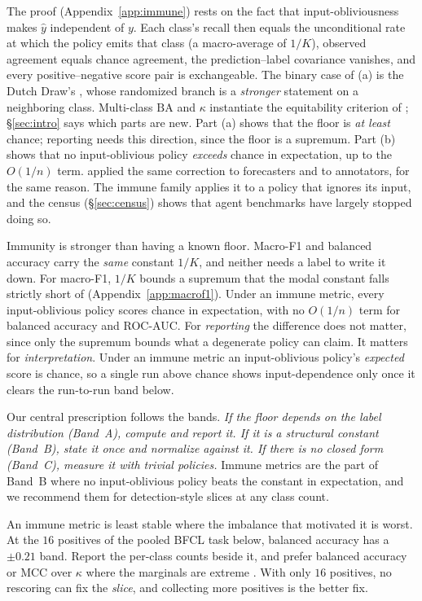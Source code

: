 \documentclass{article}
\theoremstyle{plain}
\theoremstyle{definition}
\begin{document}
The proof (Appendix~\ref{app:immune}) rests on the fact that input-obliviousness makes $\hat{y}$ independent of $y$. Each class's recall then equals the unconditional rate at which the policy emits that class (a macro-average of $1/K$), observed agreement equals chance agreement, the prediction--label covariance vanishes, and every positive--negative score pair is exchangeable. The binary case of (a) is the Dutch Draw's \citep{vandebijl2022dutchdraw}, whose randomized branch is a \emph{stronger} statement on a neighboring class. Multi-class $\mathrm{BA}$ and $\kappa$ instantiate the equitability criterion of \citet{gandin1992equitable}; \S\ref{sec:intro} says which parts are new. Part (a) shows that the floor is \emph{at least} chance; reporting needs this direction, since the floor is a supremum. Part (b) shows that no input-oblivious policy \emph{exceeds} chance in expectation, up to the $O(1/n)$ term. \citet{heidke1926} applied the same correction to forecasters and \citet{cohen1960kappa} to annotators, for the same reason. The immune family applies it to a policy that ignores its input, and the census (\S\ref{sec:census}) shows that agent benchmarks have largely stopped doing so.

Immunity is stronger than having a known floor. Macro-F1 and balanced accuracy carry the \emph{same} constant $1/K$, and neither needs a label to write it down. For macro-F1, $1/K$ bounds a supremum that the modal constant falls strictly short of (Appendix~\ref{app:macrof1}). Under an immune metric, every input-oblivious policy scores chance in expectation, with no $O(1/n)$ term for balanced accuracy and ROC-AUC. For \emph{reporting} the difference does not matter, since only the supremum bounds what a degenerate policy can claim. It matters for \emph{interpretation}. Under an immune metric an input-oblivious policy's \emph{expected} score is chance, so a single run above chance shows input-dependence only once it clears the run-to-run band below.

Our central prescription follows the bands. \emph{If the floor depends on the label distribution (Band~A), compute and report it. If it is a structural constant (Band~B), state it once and normalize against it. If there is no closed form (Band~C), measure it with trivial policies.} Immune metrics are the part of Band~B where no input-oblivious policy beats the constant in expectation, and we recommend them for detection-style slices at any class count.

An immune metric is least stable where the imbalance that motivated it is worst. At the $16$ positives of the pooled BFCL task below, balanced accuracy has a $\pm 0.21$ band. Report the per-class counts beside it, and prefer balanced accuracy or MCC over $\kappa$ where the marginals are extreme \citep{feinstein1990kappa}. With only $16$ positives, no rescoring can fix the \emph{slice}, and collecting more positives is the better fix.
\end{document}
